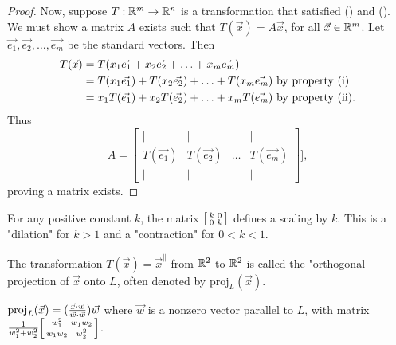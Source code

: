 \documentclass[a4paper,11pt]{article}
\begin{document}
\begin{outline}
\begin{proof}
      \backward
        Now, suppose \(T: \mathbb{R}^m \rightarrow \mathbb{R}^n\) is a transformation that satisfied
        () and (). We must show a matrix \(A\) exists such that 
        \(T(\vec{x}) = A\vec{x}\), for all \(\vec{x} \in \mathbb{R}^m\). Let \(\vec{e_1}, \vec{e_2}, 
        \ldots, \vec{e_m}\) be the standard vectors. Then
        \begin{align*}
          T(\vec{x}) &= T(x_1\vec{e_1} + x_2\vec{e_2} + \ldots + x_m\vec{e_m})\\
                     &= T(x_1\vec{e_1}) + T(x_2\vec{e_2}) + \ldots + T(x_m\vec{e_m}) 
                        \text{ by property (\romannumeral 1)}\\
                     &= x_1T(\vec{e_1}) + x_2T(\vec{e_2}) + \ldots + x_mT(\vec{e_m}) 
                        \text{ by property (\romannumeral 2).}
        \end{align*}
        Thus 
        \[ A = \begin{bmatrix}
          \vert        & \vert        &        & \vert       \\
          T(\vec{e_1}) & T(\vec{e_2}) & \ldots & T(\vec{e_m})\\
          \vert        & \vert        &        & \vert       \end{bmatrix}], 
        \] proving a matrix exists.
    \end{proof}
    
    For any positive constant \(k\), the matrix \(\begin{bsmallmatrix} k&0\\ 0&k \end{bsmallmatrix}\) defines
    a scaling by \(k\). This is a "dilation" for \(k > 1\) and a "contraction" for \(0 < k < 1\).
    
    The transformation \(T(\vec{x}) = \vec{x}^{\parallel}\) from \(\mathbb{R}^2\) to \(\mathbb{R}^2\)
    is called the "orthogonal projection of \(\vec{x}\) onto \(L\), often denoted by \(\text{proj}_{L}(\vec{x})\).
    
    \(\text{proj}_{L}(\vec{x}) = (\frac{\vec{x}\cdot\vec{w}}{\vec{w}\cdot\vec{w}})\vec{w}\) 
    where \(\vec{w}\) is a nonzero vector parallel to \(L\), with matrix \(\frac{1}{w_1^2 + w_2^2}
    \begin{bsmallmatrix} w_1^2&w_1w_2\\ w_1w_2&w_2^2 \end{bsmallmatrix}\).
    

\end{outline}
\end{document}
